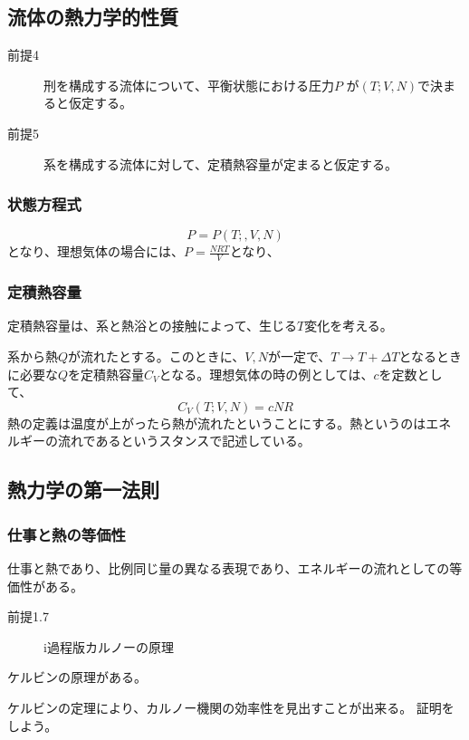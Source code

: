 \documentclass{ltjsarticle}
\begin{document}
\subsection{流体の熱力学的性質}
\begin{description}
  \item[前提4] 刑を構成する流体について、平衡状態における圧力\(P\) が\((T;V,N)\)で決まると仮定する。
  \item[前提5] 系を構成する流体に対して、定積熱容量が定まると仮定する。
\end{description}
\subsubsection{状態方程式}


\begin{equation}
  P = P(T;,V,N) 
\end{equation}
となり、理想気体の場合には、\(P= \frac{NRT}{V}\)となり、

\subsubsection{定積熱容量}
定積熱容量は、系と熱浴との接触によって、生じる\(T\)変化を考える。


系から熱\(Q\)が流れたとする。このときに、\(V,N\)が一定で、\(T\to T+ \varDelta T\)となるときに必要な\(Q\)を定積熱容量\(C_V\)となる。理想気体の時の例としては、\(c\)を定数として、
\begin{equation}
  C_V(T;V,N) = cNR
\end{equation}
熱の定義は温度が上がったら熱が流れたということにする。熱というのはエネルギーの流れであるというスタンスで記述している。


\subsection{熱力学の第一法則}
\subsubsection{仕事と熱の等価性}
仕事と熱であり、比例同じ量の異なる表現であり、エネルギーの流れとしての等価性がある。

\begin{description}
  \item[前提1.7] i過程版カルノーの原理
\end{description}
ケルビンの原理がある。

ケルビンの定理により、カルノー機関の効率性を見出すことが出来る。
証明をしよう。
\end{document}
